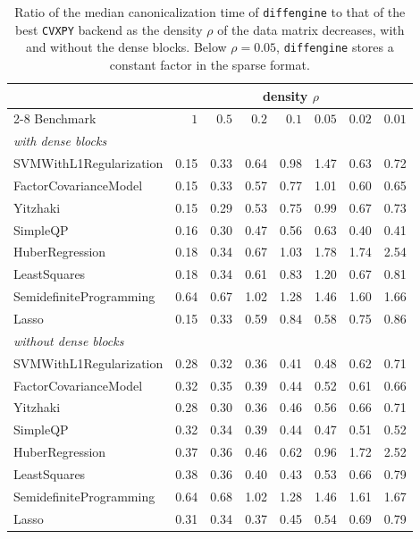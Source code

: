 \begin{table}[htbp]
\centering
\caption[Sensitivity to density]{Ratio of the median canonicalization time of
\texttt{diffengine} to that of the best \texttt{CVXPY} backend as the density $\rho$ of the data
matrix decreases, with and without the dense blocks. Below $\rho = 0.05$, \texttt{diffengine}
stores a constant factor in the sparse format.}
\label{tab:density}
{\footnotesize
\begin{tabular}{l rrrrrrr}
\toprule
& \multicolumn{7}{c}{density $\rho$} \\
\cmidrule(lr){2-8}
Benchmark & $1$ & $0.5$ & $0.2$ & $0.1$ & $0.05$ & $0.02$ & $0.01$ \\
\midrule
\multicolumn{8}{l}{\emph{with dense blocks}} \\
SVMWithL1Regularization     &  0.15 &  0.33 &  0.64 &  0.98 &  1.47 &  0.63 &  0.72 \\
FactorCovarianceModel       &  0.15 &  0.33 &  0.57 &  0.77 &  1.01 &  0.60 &  0.65 \\
Yitzhaki                    &  0.15 &  0.29 &  0.53 &  0.75 &  0.99 &  0.67 &  0.73 \\
SimpleQP                    &  0.16 &  0.30 &  0.47 &  0.56 &  0.63 &  0.40 &  0.41 \\
HuberRegression             &  0.18 &  0.34 &  0.67 &  1.03 &  1.78 &  1.74 &  2.54 \\
LeastSquares                &  0.18 &  0.34 &  0.61 &  0.83 &  1.20 &  0.67 &  0.81 \\
SemidefiniteProgramming     &  0.64 &  0.67 &  1.02 &  1.28 &  1.46 &  1.60 &  1.66 \\
Lasso                       &  0.15 &  0.33 &  0.59 &  0.84 &  0.58 &  0.75 &  0.86 \\
\midrule
\multicolumn{8}{l}{\emph{without dense blocks}} \\
SVMWithL1Regularization     &  0.28 &  0.32 &  0.36 &  0.41 &  0.48 &  0.62 &  0.71 \\
FactorCovarianceModel       &  0.32 &  0.35 &  0.39 &  0.44 &  0.52 &  0.61 &  0.66 \\
Yitzhaki                    &  0.28 &  0.30 &  0.36 &  0.46 &  0.56 &  0.66 &  0.71 \\
SimpleQP                    &  0.32 &  0.34 &  0.39 &  0.44 &  0.47 &  0.51 &  0.52 \\
HuberRegression             &  0.37 &  0.36 &  0.46 &  0.62 &  0.96 &  1.72 &  2.52 \\
LeastSquares                &  0.38 &  0.36 &  0.40 &  0.43 &  0.53 &  0.66 &  0.79 \\
SemidefiniteProgramming     &  0.64 &  0.68 &  1.02 &  1.28 &  1.46 &  1.61 &  1.67 \\
Lasso                       &  0.31 &  0.34 &  0.37 &  0.45 &  0.54 &  0.69 &  0.79 \\
\bottomrule
\end{tabular}}
\end{table}

